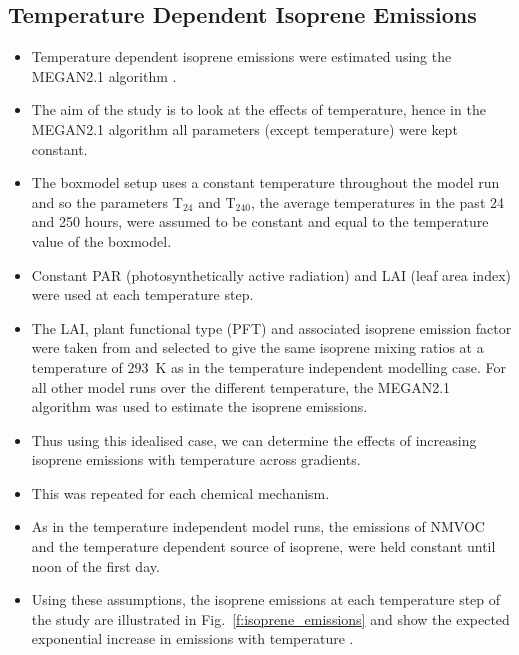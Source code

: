 \subsection{Temperature Dependent Isoprene Emissions}
\begin{itemize}
    \item Temperature dependent isoprene emissions were estimated using the MEGAN2.1 algorithm \citep{Guenther:2012}.
    \item The aim of the study is to look at the effects of temperature, hence in the MEGAN2.1 algorithm all parameters (except temperature) were kept constant.
    \item The boxmodel setup uses a constant temperature throughout the model run and so the parameters T$_{24}$ and T$_{240}$, the average temperatures in the past 24 and 250 hours, were assumed to be constant and equal to the temperature value of the boxmodel.
    \item Constant PAR (photosynthetically active radiation) and LAI (leaf area index) were used at each temperature step.
    \item The LAI, plant functional type (PFT) and associated isoprene emission factor were taken from \citet{Guenther:2012} and selected to give the same isoprene mixing ratios at a temperature of $293$~K as in the temperature independent modelling case. For all other model runs over the different temperature, the MEGAN2.1 algorithm was used to estimate the isoprene emissions.
    \item Thus using this idealised case, we can determine the effects of increasing isoprene emissions with temperature across  gradients.
    \item This was repeated for each chemical mechanism.
    \item As in the temperature independent model runs, the emissions of NMVOC and the temperature dependent source of isoprene, were held constant until noon of the first day.
    \item Using these assumptions, the isoprene emissions at each temperature step of the study are illustrated in Fig.~\ref{f:isoprene_emissions} and show the expected exponential increase in emissions with temperature \citep{Guenther:2006}.
\end{itemize}
